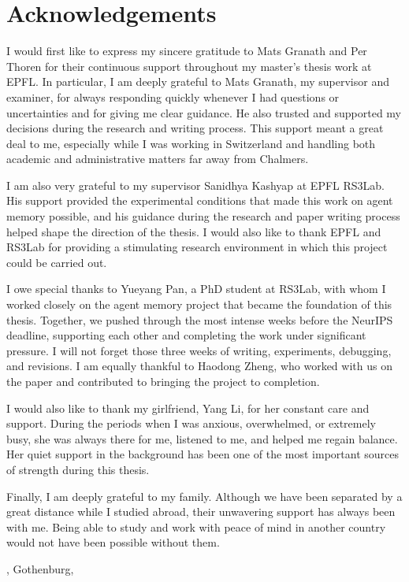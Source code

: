 \thispagestyle{plain}			%
\section*{Acknowledgements}

I would first like to express my sincere gratitude to Mats Granath and Per
Thoren for their continuous support throughout my master's thesis work at EPFL.
In particular, I am deeply grateful to Mats Granath, my supervisor and examiner,
for always responding quickly whenever I had questions or uncertainties and for
giving me clear guidance. He also trusted and supported my decisions during the
research and writing process. This support meant a great deal to me, especially
while I was working in Switzerland and handling both academic and administrative
matters far away from Chalmers.

I am also very grateful to my supervisor Sanidhya Kashyap at EPFL RS3Lab. His
support provided the experimental conditions that made this work on agent memory
possible, and his guidance during the research and paper writing process helped
shape the direction of the thesis. I would also like to thank EPFL and RS3Lab for
providing a stimulating research environment in which this project could be
carried out.

I owe special thanks to Yueyang Pan, a PhD student at RS3Lab, with whom I worked
closely on the agent memory project that became the foundation of this thesis.
Together, we pushed through the most intense weeks before the NeurIPS deadline,
supporting each other and completing the work under significant pressure. I will
not forget those three weeks of writing, experiments, debugging, and revisions. I
am equally thankful to Haodong Zheng, who worked with us on the paper and
contributed to bringing the project to completion.

I would also like to thank my girlfriend, Yang Li, for her constant care and
support. During the periods when I was anxious, overwhelmed, or extremely busy,
she was always there for me, listened to me, and helped me regain balance. Her
quiet support in the background has been one of the most important sources of
strength during this thesis.

Finally, I am deeply grateful to my family. Although we have been separated by a
great distance while I studied abroad, their unwavering support has always been
with me. Being able to study and work with peace of mind in another country would
not have been possible without them.

\vspace{1.5cm}
\hfill
\ThesisAuthor, Gothenburg, \ThesisMonthYear

\newpage				%
\thispagestyle{empty}
\mbox{}
